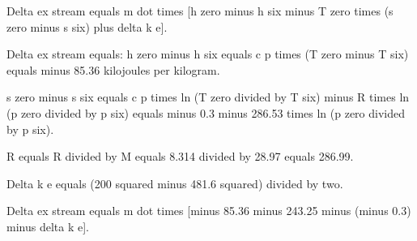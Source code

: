Delta ex stream equals m dot times [h zero minus h six minus T zero times (s zero minus s six) plus delta k e].  

Delta ex stream equals:  
h zero minus h six equals c p times (T zero minus T six) equals minus 85.36 kilojoules per kilogram.  

s zero minus s six equals c p times ln (T zero divided by T six) minus R times ln (p zero divided by p six) equals minus 0.3 minus 286.53 times ln (p zero divided by p six).  

R equals R divided by M equals 8.314 divided by 28.97 equals 286.99.  

Delta k e equals (200 squared minus 481.6 squared) divided by two.  

Delta ex stream equals m dot times [minus 85.36 minus 243.25 minus (minus 0.3) minus delta k e].